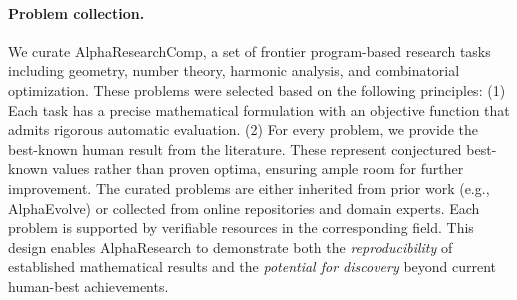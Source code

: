 \paragraph{Problem collection.}
We curate AlphaResearchComp,  a set of frontier program-based research tasks including geometry, number theory, harmonic analysis, and combinatorial optimization. These problems were selected based on the following principles: (1)  Each task has a precise mathematical formulation with an objective function that admits rigorous automatic evaluation. 
(2) For every problem, we provide the best-known human result from the literature. These represent conjectured best-known values rather than proven optima, ensuring ample room for further improvement. 
The curated problems are either inherited from prior work (e.g., AlphaEvolve) or collected from online repositories and domain experts. Each problem is supported by verifiable resources in the corresponding field. 
This design enables AlphaResearch to demonstrate both the \emph{reproducibility} of established mathematical results and the \emph{potential for discovery} beyond current human-best achievements. 








